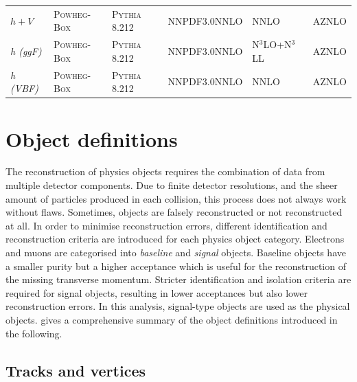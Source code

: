 \begin{table}
{\begin{tabular} {llllll}
	$h+V$ & \textsc{Powheg-Box} & \textsc{Pythia} 8.212 & NNPDF3.0NNLO & NNLO~\cite{deFlorian:2016spz} & AZNLO \\
	\textit{h (ggF)} & \textsc{Powheg-Box} & \textsc{Pythia} 8.212 & NNPDF3.0NNLO & N$^3$LO+N$^3$LL~\cite{deFlorian:2016spz} & AZNLO \\
	\textit{h (VBF)} & \textsc{Powheg-Box} & \textsc{Pythia} 8.212 & NNPDF3.0NNLO & NNLO~\cite{deFlorian:2016spz} & AZNLO \\
	\bottomrule
	\end{tabular}}\vspace{3mm}
	\label{tab:mc_generators}   
\end{table}

\section{Object definitions}

The reconstruction of physics objects requires the combination of data from multiple detector components. Due to finite detector resolutions, and the sheer amount of particles produced in each collision, this process does not always work without flaws. Sometimes, objects are falsely reconstructed or not reconstructed at all. In order to minimise reconstruction errors, different identification and reconstruction criteria are introduced for each physics object category. Electrons and muons are categorised into \textit{baseline} and \textit{signal} objects. Baseline objects have a smaller purity but a higher acceptance which is \eg useful for the reconstruction of the missing transverse momentum. Stricter identification and isolation criteria are required for signal objects, resulting in lower acceptances but also lower reconstruction errors. In this analysis, signal-type objects are used as the physical objects.  gives a comprehensive summary of the object definitions introduced in the following.

\subsection{Tracks and vertices}\label{sec:reco_tracks}

